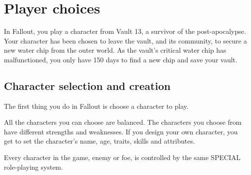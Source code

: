 



\section{Player choices}

In Fallout, you play a character from Vault 13, a survivor of the post-apocalypse. Your character has been chosen to leave the vault, and its community, to secure a new water chip from the outer world. As the vault's critical water chip has malfunctioned, you only have 150 days to find a new chip and save your vault.

\subsection{Character selection and creation}

The first thing you do in Fallout is choose a character to play.

All the characters you can choose are balanced. The characters you choose from have different strengths and weaknesses.  If you design your own character, you get to set the character's name, age, traits, skills and attributes.

Every character in the game, enemy or foe, is controlled by the same SPECIAL role-playing system.



